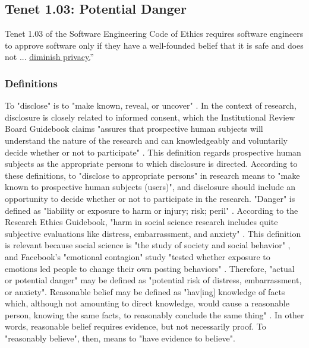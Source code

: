 \subsection{Tenet 1.03: Potential Danger}
Tenet 1.03 of the Software Engineering Code of Ethics requires software engineers to approve software only if they have a well-founded belief that it is safe and does not ... \uline{diminish privacy.}'' \cite{code} 

\subsubsection{Definitions}
To "disclose" is to "make known, reveal, or uncover" \cite{define-disclose}.  In the context of research, disclosure is closely related to informed consent, which the Institutional Review Board Guidebook claims "assures that prospective human subjects will understand the nature of the research and can knowledgeably and voluntarily decide whether or not to participate" \cite{irb-informed-consent}.  This definition regards prospective human subjects as the appropriate persons to which disclosure is directed.  According to these definitions, to "disclose to appropriate persons" in research means to "make known to prospective human subjects (users)", and disclosure should include an opportunity to decide whether or not to participate in the research.
"Danger" is defined as "liability or exposure to harm or injury; risk; peril" \cite{define-danger}.  According to the Research Ethics Guidebook, "harm in social science research includes quite subjective evaluations like distress, embarrassment, and anxiety" \cite{define-harm}.  This definition is relevant because social science is "the study of society and social behavior" \cite{define-social-science}, and Facebook's "emotional contagion" study "tested whether exposure to emotions led people to change their own posting behaviors" \cite{study}.  Therefore, "actual or potential danger" may be defined as "potential risk of distress, embarrassment, or anxiety".
Reasonable belief may be defined as "hav[ing] knowledge of facts which, although not amounting to direct knowledge, would cause a reasonable person, knowing the same facts, to reasonably conclude the same thing" \cite{define-reasonable-belief}.  In other words, reasonable belief requires evidence, but not necessarily proof.  To "reasonably believe", then, means to "have evidence to believe".

